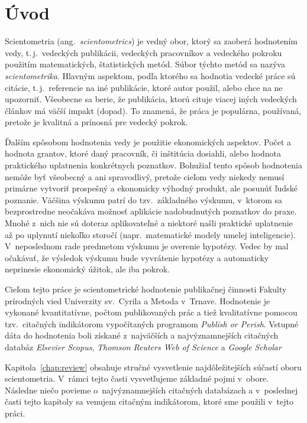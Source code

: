 \chapter*{Úvod}

Scientometria (ang.~\emph{scientometrics}) je vedný obor, ktorý sa zaoberá
hodnotením vedy, t.\,j.~vedeckých publikácii, vedeckých pracovníkov a vedeckého
pokroku použitím matematických, štatistických metód.  Súbor týchto metód sa
nazýva \emph{scientometrika}.  Hlavným aspektom, podľa ktorého sa hodnotia
vedecké práce sú citácie, t.\,j.~referencie na iné publikácie, ktoré autor
použil, alebo chce na ne upozorniť.  Všeobecne sa berie, že publikácia, ktorú
cituje viacej iných vedeckých článkov má väčší impakt (dopad).  To znamená, že
práca je populárna, používaná, pretože je kvalitná a prínosná pre vedecký
pokrok.

Ďalším spôsobom hodnotenia vedy je použitie ekonomických aspektov.  Počet a
hodnota grantov, ktoré daný pracovník, či inštitúcia dosiahli, alebo hodnota
praktického uplatnenia konkrétnych poznatkov.  Bohužiaľ tento spôsob hodnotenia
nemôže byť všeobecný a ani spravodlivý, pretože cieľom vedy niekedy nemusí
primárne vytvoriť prospešný a ekonomicky výhodný produkt, ale posunúť ľudské
poznanie.  Väčšina výskumu patrí do tzv.~základného výskumu, v~ktorom sa
bezprostredne neočakáva možnosť aplikácie nadobudnutých poznatkov do praxe.
Mnohé z~nich nie sú doteraz aplikovateľné a niektoré našli praktické uplatnenie
až po uplynutí niekoľko storočí (napr.~matematické modely umelej inteligencie).
V~neposlednom rade predmetom výskumu je overenie hypotézy.  Vedec by mal
očakávať, že výsledok výskumu bude vyvrátenie hypotézy a automaticky neprinesie
ekonomický úžitok, ale iba pokrok.

Cieľom tejto práce je scientometrické hodnotenie publikačnej činnosti Fakulty
prírodných vied Univerzity sv.~Cyrila a Metoda v~Trnave.  Hodnotenie je
vykonané kvantitatívne, počtom publikovaných prác a tiež kvalitatívne pomocou
tzv.~citačných indikátorom vypočítaných programom \emph{Publish or Perish}.
Vstupné dáta do hodnotenia boli získané z~najväčších a najvýznamnejších
citačných databáz \emph{Elsevier Scopus}, \emph{Thomson Reuters Web of Science}
a \emph{Google Scholar}

Kapitola~\ref{chap:review} obsahuje stručné vysvetlenie najdôležitejších súčastí
oboru scientometria. V~rámci tejto časti vysvetľujeme základné pojmi v~obore.
Následne niečo povieme o~najvýznamnejších citačných databázach a v~poslednej
časti tejto kapitoly sa venujem citačným indikátorom, ktoré sme použili v~tejto
práci.

